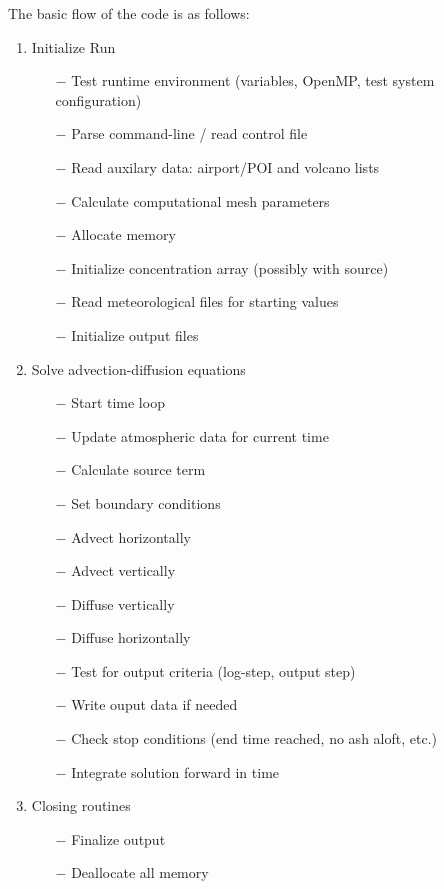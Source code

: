 The basic flow of the code is as follows:
\begin{enumerate}
 \item Initialize Run
 \begin{itemize}
  \item[$-$] Test runtime environment (variables, OpenMP, test system configuration)
  \item[$-$] Parse command-line / read control file
  \item[$-$] Read auxilary data: airport/POI and volcano lists
  \item[$-$] Calculate computational mesh parameters
  \item[$-$] Allocate memory
  \item[$-$] Initialize concentration array (possibly with source)
  \item[$-$] Read meteorological files for starting values
  \item[$-$] Initialize output files
 \end{itemize}
 \item Solve advection-diffusion equations
 \begin{itemize}
  \item[$-$] Start time loop
  \item[$-$] Update atmospheric data for current time
  \item[$-$] Calculate source term
  \item[$-$] Set boundary conditions
  \item[$-$] Advect horizontally
  \item[$-$] Advect vertically
  \item[$-$] Diffuse vertically
  \item[$-$] Diffuse horizontally
  \item[$-$] Test for output criteria (log-step, output step)
  \item[$-$] Write ouput data if needed
  \item[$-$] Check stop conditions (end time reached, no ash aloft, etc.)
  \item[$-$] Integrate solution forward in time
 \end{itemize}
 \item Closing routines
 \begin{itemize}
  \item[$-$] Finalize output
  \item[$-$] Deallocate all memory
 \end{itemize}
\end{enumerate}


